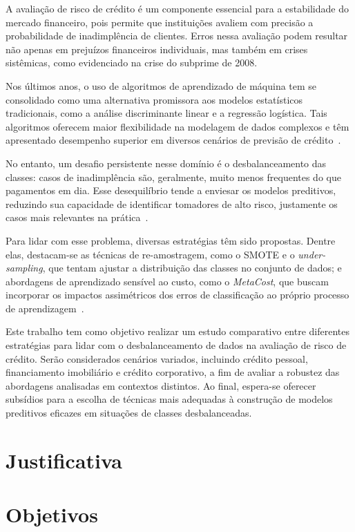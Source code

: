 A avaliação de risco de crédito é um componente essencial para a estabilidade do mercado financeiro, pois permite que instituições avaliem com precisão a probabilidade de inadimplência de clientes. Erros nessa avaliação podem resultar não apenas em prejuízos financeiros individuais, mas também em crises sistêmicas, como evidenciado na crise do subprime de 2008.

Nos últimos anos, o uso de algoritmos de aprendizado de máquina tem se consolidado como uma alternativa promissora aos modelos estatísticos tradicionais, como a análise discriminante linear e a regressão logística. Tais algoritmos oferecem maior flexibilidade na modelagem de dados complexos e têm apresentado desempenho superior em diversos cenários de previsão de crédito~\cite{Shi2022}.

No entanto, um desafio persistente nesse domínio é o desbalanceamento das classes: casos de inadimplência são, geralmente, muito menos frequentes do que pagamentos em dia. Esse desequilíbrio tende a enviesar os modelos preditivos, reduzindo sua capacidade de identificar tomadores de alto risco, justamente os casos mais relevantes na prática~\cite{Namvar2018}.

Para lidar com esse problema, diversas estratégias têm sido propostas. Dentre elas, destacam-se as técnicas de re-amostragem, como o SMOTE e o \textit{under-sampling}, que tentam ajustar a distribuição das classes no conjunto de dados; e abordagens de aprendizado sensível ao custo, como o \textit{MetaCost}, que buscam incorporar os impactos assimétricos dos erros de classificação ao próprio processo de aprendizagem~\cite{FernndezCs2018,Wei2025}.

Este trabalho tem como objetivo realizar um estudo comparativo entre diferentes estratégias para lidar com o desbalanceamento de dados na avaliação de risco de crédito. Serão considerados cenários variados, incluindo crédito pessoal, financiamento imobiliário e crédito corporativo, a fim de avaliar a robustez das abordagens analisadas em contextos distintos. Ao final, espera-se oferecer subsídios para a escolha de técnicas mais adequadas à construção de modelos preditivos eficazes em situações de classes desbalanceadas.

\section{Justificativa}\label{sec:motivacao}

\section{Objetivos}\label{sec:objetivos}
